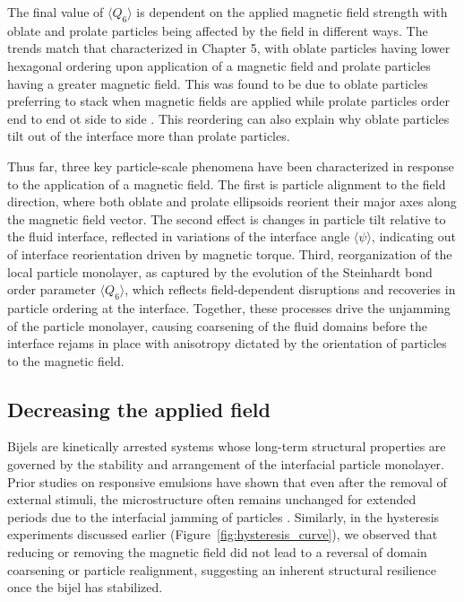 The final value of \(\langle Q_6 \rangle\) is dependent on the applied magnetic field strength with oblate and prolate particles being affected by the field in
different ways. The trends match that characterized in Chapter 5, with oblate particles having lower hexagonal ordering upon application of a magnetic field
and prolate particles having a greater magnetic field. This was found to be due to oblate particles preferring to stack when magnetic fields are applied while
prolate particles order end to end ot side to side \cite{dabat_mesoscale_2018, eatson_capillary_2023}. This reordering can also explain why oblate particles
tilt out of the interface more than prolate particles.

Thus far, three key particle-scale phenomena have been characterized in response to the application of a magnetic field. The first is
particle alignment to the field direction, where both oblate and prolate ellipsoids reorient their major axes along the magnetic field vector. The second effect is
changes in particle tilt relative to the fluid interface, reflected in variations of the interface angle \(\langle \psi \rangle\), indicating out of interface 
reorientation driven by magnetic torque. Third, reorganization of the local particle monolayer, as captured by the evolution of the Steinhardt bond order parameter 
\(\langle Q_6 \rangle\), which reflects field-dependent disruptions and recoveries in particle ordering at the interface. Together, these processes 
drive the unjamming of the particle monolayer, causing coarsening of the fluid domains before the interface rejams in place with anisotropy dictated by the orientation
of particles to the magnetic field.

\subsection{Decreasing the applied field}
\label{decreasing-the-applied-field}

Bijels are kinetically arrested systems whose long-term structural properties are governed by the stability and arrangement 
of the interfacial particle monolayer. Prior studies on responsive emulsions have shown that even after the removal of external 
stimuli, the microstructure often remains unchanged for extended periods due to the interfacial 
jamming of particles \cite{cui_stabilizing_2013}. Similarly, in the hysteresis experiments 
discussed earlier (Figure~\ref{fig:hysteresis_curve}), we observed that reducing or removing the magnetic field did not 
lead to a reversal of domain coarsening or particle realignment, suggesting an inherent structural resilience once the bijel 
has stabilized.

